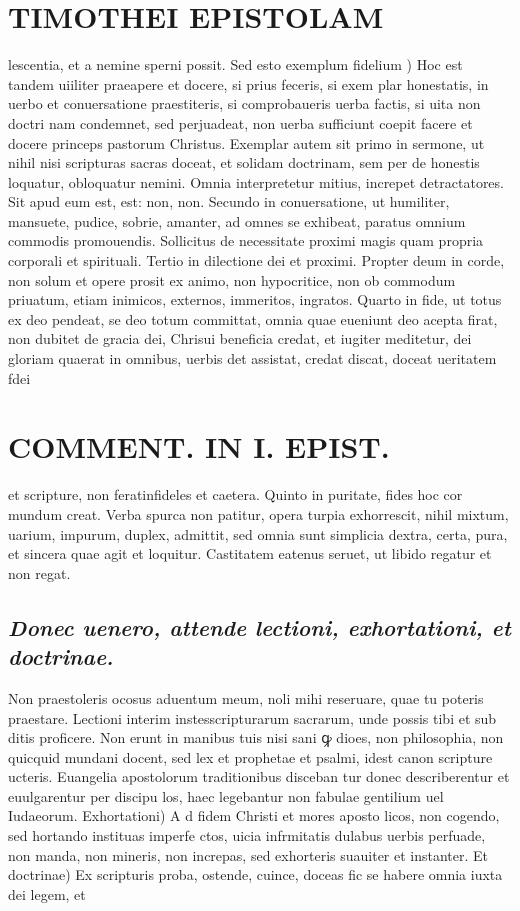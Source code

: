 \documentclass{article}
\begin{document}
\begin{pages}
\section*{TIMOTHEI EPISTOLAM }
\marginpar{[ p.109 ]}\pstart lescentia, et a nemine sperni possit.  \pend\pstart Sed esto exemplum fidelium ) Hoc est tandem uiiliter praeapere et docere, si prius feceris, si exem plar honestatis, in uerbo et conuersatione praestiteris, si comprobaueris uerba factis, si uita non doctri nam condemnet, sed perjuadeat, non uerba sufficiunt coepit facere et docere princeps pastorum Christus. Exemplar autem sit primo in sermone, ut nihil nisi scripturas sacras doceat, et solidam doctrinam, sem per de honestis loquatur, obloquatur nemini. Omnia interpretetur mitius, increpet detractatores. Sit apud eum est, est: non, non. Secundo in conuersatione, ut humiliter, mansuete, pudice, sobrie, amanter, ad omnes se exhibeat, paratus omnium commodis promouendis. Sollicitus de necessitate proximi magis quam propria corporali et spirituali. Tertio in dilectione dei et proximi. Propter deum in corde, non solum et opere prosit ex animo, non hypocritice, non ob commodum priuatum, etiam inimicos, externos, immeritos, ingratos. Quarto in fide, ut totus ex deo pendeat, se deo totum committat, omnia quae eueniunt deo acepta firat, non dubitet de gracia dei, Chrisui beneficia credat, et iugiter meditetur, dei gloriam quaerat in omnibus, uerbis det assistat, credat discat, doceat ueritatem fdei  \pend
\section*{COMMENT. IN I. EPIST. }
\marginpar{[ p.110 ]}\pstart et scripture, non feratinfideles et caetera. Quinto in puritate, fides hoc cor mundum creat. Verba spurca non patitur, opera turpia exhorrescit, nihil mixtum, uarium, impurum, duplex, admittit, sed omnia sunt simplicia dextra, certa, pura, et sincera quae agit et loquitur. Castitatem eatenus seruet, ut libido regatur et non regat.  \pend
{}
{}
\subsection*{\textit{Donec uenero, attende lectioni, exhortationi, et doctrinae. }}\pstart Non praestoleris ocosus aduentum meum, noli mihi reseruare, quae tu poteris praestare. Lectioni interim instesscripturarum sacrarum, unde possis tibi et sub ditis proficere. Non erunt in manibus tuis nisi sani ꝙ dioes, non philosophia, non quicquid mundani docent, sed lex et prophetae et psalmi, idest canon scripture ucteris. Euangelia apostolorum traditionibus disceban tur donec describerentur et euulgarentur per discipu los, haec legebantur non fabulae gentilium uel Iudaeorum.  \pend\pstart Exhortationi) A d fidem Christi et mores aposto licos, non cogendo, sed hortando instituas imperfe ctos, uicia infrmitatis dulabus uerbis perfuade, non manda, non mineris, non increpas, sed exhorteris suauiter et instanter.  \pend\pstart Et doctrinae) Ex scripturis proba, ostende, cuince, doceas fic se habere omnia iuxta dei legem, et  \pend

\end{pages}
\end{document}
